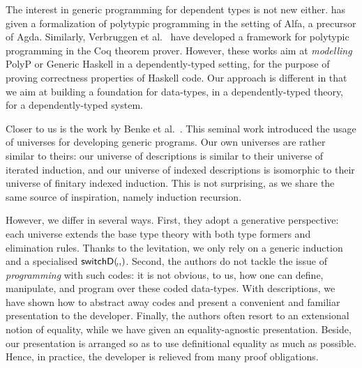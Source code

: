 The interest in generic programming for dependent types is not new
either. \citet{norell:msc-thesis} has given a formalization of
polytypic programming in the setting of Alfa, a precursor of
Agda. Similarly, Verbruggen et al.~\cite{verbruggen:polytype-prog-coq,
  verbruggen:polytype-coq} have developed a framework for polytypic
programming in the Coq theorem prover. However, these works aim at
\emph{modelling} PolyP or Generic Haskell in a dependently-typed
setting, for the purpose of proving correctness properties of Haskell
code. Our approach is different in that we aim at building a
foundation for data-types, in a dependently-typed theory, for a
dependently-typed system.

Closer to us is the work by Benke et
al.~\cite{benke:universe-generic-prog}. This seminal work introduced
the usage of universes for developing generic programs. Our own
universes are rather similar to theirs: our universe of descriptions
is similar to their universe of iterated induction, and our universe
of indexed descriptions is isomorphic to their universe of finitary
indexed induction. This is not surprising, as we share the same source
of inspiration, namely induction recursion.

However, we differ in several ways. First, they adopt a generative
perspective: each universe extends the base type theory with both type
formers and elimination rules. Thanks to the levitation, we only rely
on a generic induction and a specialised
$\switchD{\!}{\!}{\!}$. Second, the authors do not tackle the issue of
\emph{programming} with such codes: it is not obvious, to us, how one
can define, manipulate, and program over these coded data-types. With
descriptions, we have shown how to abstract away codes and present a
convenient and familiar presentation to the developer. Finally, the
authors often resort to an extensional notion of equality, while we
have given an equality-agnostic presentation. Beside, our presentation
is arranged so as to use definitional equality as much as
possible. Hence, in practice, the developer is relieved from many
proof obligations.
